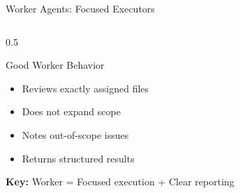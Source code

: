 \documentclass[aspectratio=169,11pt]{beamer}
\begin{document}
\begin{frame}{Worker Agents: Focused Executors}
\begin{columns}[T]
\begin{column}{0.5\textwidth}
\begin{exampleblock}{Good Worker Behavior}
\begin{itemize}
    \item Reviews exactly assigned files
    \item Does not expand scope
    \item Notes out-of-scope issues
    \item Returns structured results
\end{itemize}
\end{exampleblock}

\vspace{0.2cm}
\textbf{Key:} Worker = Focused execution + Clear reporting
\end{column}
\end{columns}
\end{frame}
\end{document}
